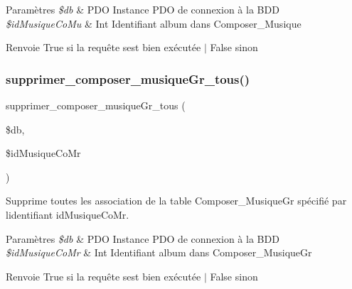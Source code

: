 \begin{DoxyParams}{Paramètres}
{\em \$db} & P\+DO Instance P\+DO de connexion à la B\+DD \\
\hline
{\em \$id\+Musique\+Co\+Mu} & Int Identifiant album dans Composer\+\_\+\+Musique \\
\hline
\end{DoxyParams}
\begin{DoxyReturn}{Renvoie}
True si la requête s\textquotesingle{}est bien exécutée $\vert$ False sinon 
\end{DoxyReturn}
\mbox{\label{fonctionMusique_8php_a3e655cbddf1539e8d07f245911fe7d5f}} 
\subsubsection{\texorpdfstring{supprimer\+\_\+composer\+\_\+musique\+Gr\+\_\+tous()}{supprimer\_composer\_musiqueGr\_tous()}}
{\footnotesize\ttfamily supprimer\+\_\+composer\+\_\+musique\+Gr\+\_\+tous (\begin{DoxyParamCaption}\item[{}]{\$db,  }\item[{}]{\$id\+Musique\+Co\+Mr }\end{DoxyParamCaption})}



Supprime toutes les association de la table Composer\+\_\+\+Musique\+Gr spécifié par l\textquotesingle{}identifiant \textquotesingle{}id\+Musique\+Co\+Mr\textquotesingle{}. 


\begin{DoxyParams}{Paramètres}
{\em \$db} & P\+DO Instance P\+DO de connexion à la B\+DD \\
\hline
{\em \$id\+Musique\+Co\+Mr} & Int Identifiant album dans Composer\+\_\+\+Musique\+Gr \\
\hline
\end{DoxyParams}
\begin{DoxyReturn}{Renvoie}
True si la requête s\textquotesingle{}est bien exécutée $\vert$ False sinon 
\end{DoxyReturn}
\mbox{\label{fonctionMusique_8php_a51691c70f94810c4b072c4b7efe74b41}} 
